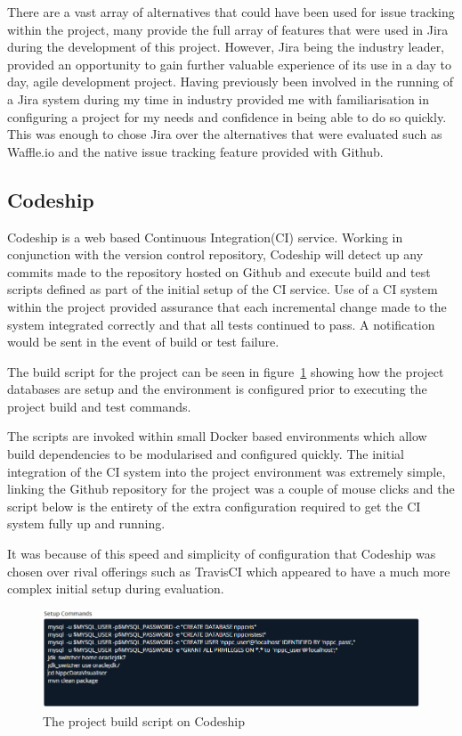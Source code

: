 There are a vast array of alternatives that could have been used for issue tracking within the project, many provide the full array of features that were used in Jira during the development of this project. However, Jira being the industry leader, provided an opportunity to gain further valuable experience of its use in a day to day, agile development project. Having previously been involved in the running of a Jira system during my time in industry provided me with familiarisation in configuring a project for my needs and confidence in being able to do so quickly. This was enough to chose Jira over the alternatives that were evaluated such as Waffle.io and the native issue tracking feature provided with Github.

\subsection{Codeship} 
Codeship\cite{_codeship} is a web based Continuous Integration(CI) service. Working in conjunction with the version control repository, Codeship will detect up any commits made to the repository hosted on Github and execute build and test scripts defined as part of the initial setup of the CI service. Use of a CI system within the project provided assurance that each incremental change made to the system integrated correctly and that all tests continued to pass. A notification would be sent in the event of build or test failure.  

 The build script for the project can be seen in figure~\ref{fig:build_script} showing how the project databases are setup and the environment is configured prior to executing the project build and test commands.

 The scripts are invoked within small Docker \cite{docker} based environments which allow build dependencies to be modularised and configured quickly. The initial integration of the CI system into the project environment was extremely simple, linking the Github repository for the project was a couple of mouse clicks and the script below is the entirety of the extra configuration required to get the CI system fully up and running. 

It was because of this speed and simplicity of configuration that Codeship was chosen over rival offerings such as TravisCI \cite{travis} which appeared to have a much more complex initial setup during evaluation.

\begin{figure}[H]
    \centering
    \includegraphics[width=\textwidth]{images/tools/codeShipScript}
    \caption{The project build script on Codeship}
    \label{fig:build_script}
\end{figure} 

